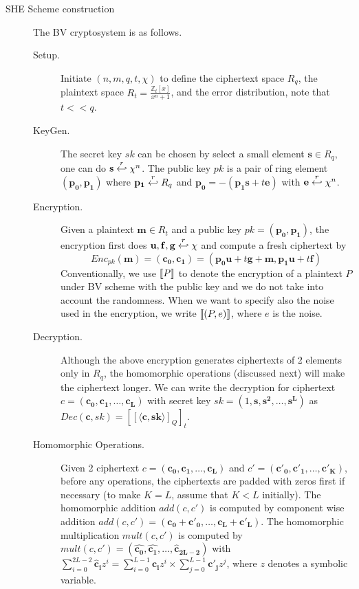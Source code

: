 \begin{description}
\item [SHE Scheme construction]
  \label{sec:BVScheme}
  The BV cryptosystem is as follows.
  \begin{description}
  \item[Setup.] Initiate $(n,m,q,t, \chi)$ to define the ciphertext space $R_q$,
    the plaintext space $R_t = \frac{\mathbb{Z}_{t}[x]}{x^{n} + 1}$, and the
    error distribution, note that \(t << q\).
  \item[KeyGen.] The secret key $sk$ can be chosen by select a small element
    $\mathbf{s} \in R_{q}$, one can do $\mathbf{s} \stackrel{r}{\hookleftarrow} \chi^{n}$. The
    public key $pk$ is a pair of ring element $(\mathbf{p_0},\mathbf{p_1})$
    where $\mathbf{p_1} \stackrel{r}{\hookleftarrow} R_q$ and
    $\mathbf{p_0} = -(\mathbf{p_1}\mathbf{s} + t\mathbf{e})$ with
    $\mathbf{e} \stackrel{r}{\hookleftarrow} \chi^{n}$.
  \item[Encryption.] Given a plaintext $\mathbf{m} \in R_t$ and a public key
    $pk=(\mathbf{p_0},\mathbf{p_1})$, the encryption first does
    $\mathbf{u},\mathbf{f},\mathbf{g} \stackrel{r}{\hookleftarrow} \chi$ and compute a fresh
    ciphertext by
    \[
      Enc_{pk}(\mathbf{m}) = (\mathbf{c_0},\mathbf{c_1}) =
      (\mathbf{p_0}\mathbf{u} + t\mathbf{g} + \mathbf{m},
      \mathbf{p_1}\mathbf{u} + t\mathbf{f})
    \]
    Conventionally, we use $\left\llbracket P\right\rrbracket$ to denote the encryption of a plaintext $P$
    under BV scheme with the public key and we do not take into account the
    randomness. When we want to specify also the noise used in the encryption,
    we write $\left\llbracket(P,e)\right\rrbracket$, where $e$ is the noise.
  \item[Decryption.] Although the above encryption generates ciphertexts of 2
    elements only in $R_q$, the homomorphic operations (discussed next) will
    make the ciphertext longer. We can write the decryption for ciphertext
    $c=(\mathbf{c_0},\mathbf{c_1},\dots,\mathbf{c_L})$ with secret key
    $sk = (1, \mathbf{s}, \mathbf{s^2},\dots, \mathbf{s^L})$ as
    $ Dec(\mathbf{c},sk) = \left[\left[ \langle \mathbf{c}, \mathbf{sk} \rangle
      \right]_Q \right]_t $.
  \item[Homomorphic Operations.] Given 2 ciphertext
    $c = (\mathbf{c_0},\mathbf{c_1},\dots,\mathbf{c_L})$ and
    $c' = (\mathbf{c'_0},\mathbf{c'_1},\dots,\mathbf{c'_{K}})$, before any
    operations, the ciphertexts are padded with zeros first if necessary (to
    make $K = L$, assume that $K < L$ initially).  The homomorphic addition
    $add(c,c')$ is computed by component wise addition
    $add(c,c') = (\mathbf{c_0} +\mathbf{c'_0}, \dots,
    \mathbf{c_L}+\mathbf{c'_L})$. The homomorphic multiplication $mult(c,c')$ is
    computed by
    $mult(c,c') = (\mathbf{\hat{c_0}}, \mathbf{\hat{c_1}}, \dots,
    \mathbf{\hat{c}_{2L-2}})$ with
    $ \sum_{i=0}^{2L-2}\mathbf{\hat{c}_i}z^i = \sum_{i=0}^{L-1}\mathbf{c_i}z^i
    \times \sum_{j=0}^{L-1}\mathbf{c'_j}z^j $, where $z$ denotes a symbolic
    variable.

  \end{description}

\end{description}
